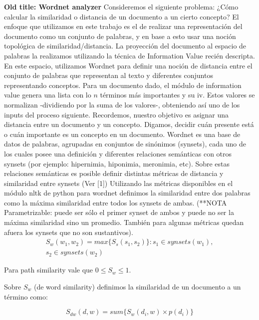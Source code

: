 \documentclass{pnastwo}
\begin{document}
\begin{article}
\textbf{Old title: Wordnet analyzer}
Consideremos el siguiente problema:
\newline
¿Cómo calcular la similaridad o distancia de un documento a un cierto concepto? 
\newline
El enfoque que utilizamos en este trabajo es el de realizar una representación del documento como un conjunto de palabras, y en base a esto usar una noción topológica de similaridad/distancia. La proyección del documento al espacio de palabras la realizamos utilizando la t\'ecnica de Information Value reci\'en descripta.
En este espacio, utilizamos Wordnet para definir una noción de distancia entre el conjunto de palabras que representan al texto y diferentes conjuntos representando conceptos.
\newline
Para un documento dado, el módulo de information value genera una lista con lo $n$ términos más importantes y su iv. Estos valores se normalizan -dividiendo por la suma de los valores-, obteniendo así uno de los inputs del proceso siguiente. Recordemos, nuestro objetivo es asignar una distancia entre un documento y un concepto. Digamos, decidir cuán presente está o cuán importante es un concepto en un documento.
\newline
Wordnet es una base de datos de palabras, agrupadas en conjuntos de sinónimos (synsets), cada uno de los cuales posee una definición y diferentes relaciones semánticas con otros synsets (por ejemplo: hipernimia, hiponimia, meronimia, etc). Sobre estas relaciones semánticas es posible definir distintas métricas de distancia y similaridad entre synsets (Ver [1])
\newline
Utilizando las métricas disponibles en el módulo nltk de python para wordnet definimos la similaridad entre dos palabras como la máxima similaridad entre todos los synsets de ambas. (**NOTA Parametrizable: puede ser sólo el primer synset de ambos y puede no ser la máxima similaridad sino un promedio. También para algunas métricas quedan afuera los synsets que no son sustantivos). 
\begin{multline}
S_w(w_1, w_2) = max \{ S_s(s_1, s_2) \}: s_1 \in synsets(w_1),\\ s_2 \in synsets(w_2)
\end{multline}

Para path similarity vale que $0 \leq S_w \leq 1$. 

Sobre $S_w$ (de word similarity) definimos la similaridad de un documento a un término como:

\begin{equation}
S_{dw}(d, w) = sum \{ S_w(d_i, w) \times p(d_i)  \} 
\end{equation}


\end{article}
\end{document}
